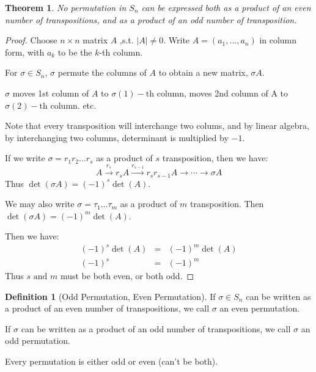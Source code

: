 \documentclass{article}
\theoremstyle{MyNonumberplain}
\theoremstyle{break}
\newtheorem*{proof}{Proof. }
\newcommand{\infixand}{\text{ and }}
\newcommand{\tmop}{\text}
\theoremstyle{break}
\newtheorem{theorem}{Theorem}[section]
\theoremstyle{break}
\theoremstyle{definition}
\theoremstyle{break}
\newtheorem{definition}{Definition}[section]
\begin{document}
\begin{thmbox}
    \begin{theorem}
        No permutation in $S_n$ can be expressed both as a product of an even number of transpositions, and as a product of an odd number of transposition.
    \end{theorem}

    \begin{prfbox}
        \begin{proof}
            Choose $n \times n$ matrix $A$ ,s.t. $| A | \neq 0$. Write $A = (a_1, \ldots,
            a_n)$ in column form, with $a_k$ to be the $k$-th column.\bigskip

            For $\sigma \in S_n$, $\sigma$ permute the columns of $A$ to obtain a new
            matrix, $\sigma A$.\bigskip

            $\sigma$ moves 1st column of $A$ to $\sigma (1) - \tmop{th}$ column, moves 2nd
            column of A to $\sigma (2) - \tmop{th}$ column. etc.\bigskip

            Note that every transposition will interchange two colums, and by linear
            algebra, by interchanging two columns, determinant is multiplied by $- 1$.\bigskip

            If we write $\sigma = r_1 r_2 \ldots r_s$ as a product of $s$ transposition,
            then we have:
            \[ A \xrightarrow{r_s} r_s A \xrightarrow{r_{s - 1}} r_s r_{s - 1} A
            \rightarrow \cdots \rightarrow \sigma A \]
            Thus $\det (\sigma A) = (- 1)^s \det (A)$.\bigskip

            We may also write $\sigma = \tau_1 \ldots \tau_m$ as a product of $m$
            transposition. Then $\det (\sigma A) = (- 1)^m \det (A)$.\bigskip

            Then we have:
            \begin{eqnarray*}
            (- 1)^s \det (A) & = & (- 1)^m \det (A)\\
            (- 1)^s & = & (- 1)^m
            \end{eqnarray*}
            Thus $s \infixand m$ must be both even, or both odd.
        \end{proof}
    \end{prfbox}
\end{thmbox}

\begin{defbox}
    \begin{definition}[Odd Permutation, Even Permutation]
        If $\sigma\in S_n$ can be written as a product of an even number of transpositions, we
        call $\sigma$ an even permutation.\bigskip 
        
        If $\sigma$ can be written as a product of an odd number of transpositions,
        we call $\sigma$ an odd permutation.\bigskip

        Every permutation is either odd or even (can't be both).
    \end{definition}
\end{defbox}
\end{document}
